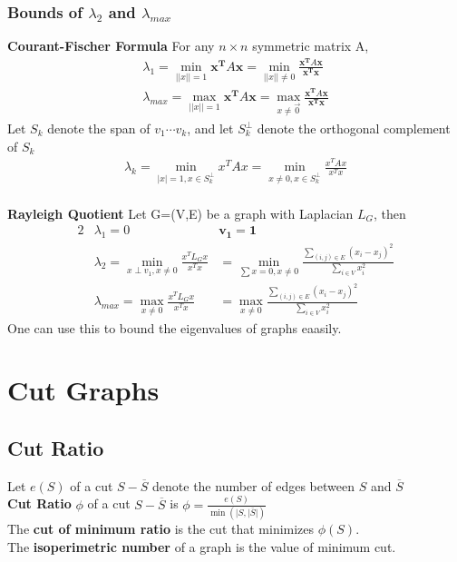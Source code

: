 \documentclass[12pt, letterpaper]{report}
\begin{document}
    \subsubsection{Bounds of $\lambda_2$ and $\lambda_{max}$}
    \textbf{Courant-Fischer Formula} For any $n\times n$ symmetric matrix A,
    \begin{gather*}
        \lambda_{1} = \min_{||x||=1} \mathbf{x^T}A\mathbf{x} = \min_{||x||\neq 0}\frac{\mathbf{x^T}A\mathbf{x}}{\mathbf{x^Tx}}\\
        \lambda_{max} = \max_{||x||=1}{\mathbf{x^T}A\mathbf{x}} = \max_{x\neq \vec{0}}\frac{\mathbf{x^T}A\mathbf{x}}{\mathbf{x^Tx}}
    \end{gather*}
    Let $S_k$ denote the span of $v_1 \cdots v_k$, and let $S_k^\perp$ denote the orthogonal complement of $S_k$
    \begin{gather*}
        \lambda_k = \min_{|x|=1,x\in S_k^\perp}x^TAx=\min_{x\neq 0,x\in S_k^\perp}\frac{x^TAx}{x^Tx}
    \end{gather*}
    \\
    \textbf{Rayleigh Quotient}
    Let G=(V,E) be a graph with Laplacian $L_{G}$, then
    \begin{alignat*}{2}
        &\lambda_1 = 0 & \mathbf{v_1} = \mathbf{1}\\
        &\lambda_2 = \min_{x\perp v_1,x\neq 0}\frac{x^T L_G x}{x^Tx} &=\min_{\sum x=0,x\neq 0} \frac{\sum_{(i,j)\in E}(x_i-x_j)^2}{\sum_{i \in V}x_i^2}\\
        &\lambda_{max} = \max_{x\neq 0}\frac{x^T L_G x}{x^Tx} &=\max_{x\neq 0} \frac{\sum_{(i,j)\in E}(x_i-x_j)^2}{\sum_{i \in V}x_i^2}
    \end{alignat*}
    One can use this to bound the eigenvalues of graphs eaasily.
    \section{Cut Graphs}
    \subsection{Cut Ratio}
    Let $e(S)$ of a cut $S-\overline{S}$ denote the number of edges between $S$ and $\overline{S}$\\
    \textbf{Cut Ratio} $\phi$ of a cut $S-\overline{S}$ is $\phi = \frac{e(S)}{\min(|S, |\overline{S}|)}$\\
    The \textbf{cut of minimum ratio} is the cut that minimizes $\phi(S)$.\\The \textbf{isoperimetric number} of a graph is the value of minimum cut.
\end{document}
